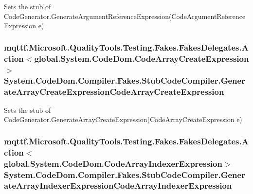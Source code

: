 Sets the stub of Code\-Generator.\-Generate\-Argument\-Reference\-Expression(\-Code\-Argument\-Reference\-Expression e)

\hypertarget{class_system_1_1_code_dom_1_1_compiler_1_1_fakes_1_1_stub_code_compiler_a65878db14d81f21f65e4e37465644802}{
\subsubsection[{Generate\-Array\-Create\-Expression\-Code\-Array\-Create\-Expression}]{\setlength{\rightskip}{0pt plus 5cm}mqttf.\-Microsoft.\-Quality\-Tools.\-Testing.\-Fakes.\-Fakes\-Delegates.\-Action$<$global.\-System.\-Code\-Dom.\-Code\-Array\-Create\-Expression$>$ System.\-Code\-Dom.\-Compiler.\-Fakes.\-Stub\-Code\-Compiler.\-Generate\-Array\-Create\-Expression\-Code\-Array\-Create\-Expression}}\label{class_system_1_1_code_dom_1_1_compiler_1_1_fakes_1_1_stub_code_compiler_a65878db14d81f21f65e4e37465644802}


Sets the stub of Code\-Generator.\-Generate\-Array\-Create\-Expression(\-Code\-Array\-Create\-Expression e)

\hypertarget{class_system_1_1_code_dom_1_1_compiler_1_1_fakes_1_1_stub_code_compiler_a91eea73c2927de83553395c38cbfbe39}{
\subsubsection[{Generate\-Array\-Indexer\-Expression\-Code\-Array\-Indexer\-Expression}]{\setlength{\rightskip}{0pt plus 5cm}mqttf.\-Microsoft.\-Quality\-Tools.\-Testing.\-Fakes.\-Fakes\-Delegates.\-Action$<$global.\-System.\-Code\-Dom.\-Code\-Array\-Indexer\-Expression$>$ System.\-Code\-Dom.\-Compiler.\-Fakes.\-Stub\-Code\-Compiler.\-Generate\-Array\-Indexer\-Expression\-Code\-Array\-Indexer\-Expression}}\label{class_system_1_1_code_dom_1_1_compiler_1_1_fakes_1_1_stub_code_compiler_a91eea73c2927de83553395c38cbfbe39}


